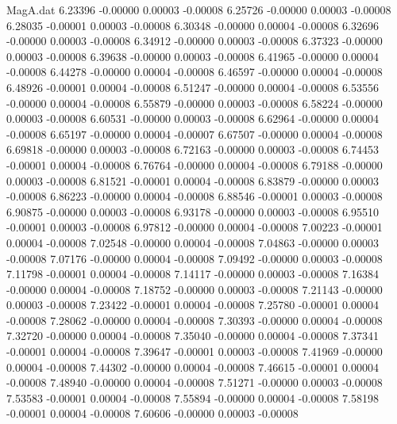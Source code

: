\begin{filecontents}{MagA.dat}
   6.23396   -0.00000    0.00003   -0.00008
   6.25726   -0.00000    0.00003   -0.00008
   6.28035   -0.00001    0.00003   -0.00008
   6.30348   -0.00000    0.00004   -0.00008
   6.32696   -0.00000    0.00003   -0.00008
   6.34912   -0.00000    0.00003   -0.00008
   6.37323   -0.00000    0.00003   -0.00008
   6.39638   -0.00000    0.00003   -0.00008
   6.41965   -0.00000    0.00004   -0.00008
   6.44278   -0.00000    0.00004   -0.00008
   6.46597   -0.00000    0.00004   -0.00008
   6.48926   -0.00001    0.00004   -0.00008
   6.51247   -0.00000    0.00004   -0.00008
   6.53556   -0.00000    0.00004   -0.00008
   6.55879   -0.00000    0.00003   -0.00008
   6.58224   -0.00000    0.00003   -0.00008
   6.60531   -0.00000    0.00003   -0.00008
   6.62964   -0.00000    0.00004   -0.00008
   6.65197   -0.00000    0.00004   -0.00007
   6.67507   -0.00000    0.00004   -0.00008
   6.69818   -0.00000    0.00003   -0.00008
   6.72163   -0.00000    0.00003   -0.00008
   6.74453   -0.00001    0.00004   -0.00008
   6.76764   -0.00000    0.00004   -0.00008
   6.79188   -0.00000    0.00003   -0.00008
   6.81521   -0.00001    0.00004   -0.00008
   6.83879   -0.00000    0.00003   -0.00008
   6.86223   -0.00000    0.00004   -0.00008
   6.88546   -0.00001    0.00003   -0.00008
   6.90875   -0.00000    0.00003   -0.00008
   6.93178   -0.00000    0.00003   -0.00008
   6.95510   -0.00001    0.00003   -0.00008
   6.97812   -0.00000    0.00004   -0.00008
   7.00223   -0.00001    0.00004   -0.00008
   7.02548   -0.00000    0.00004   -0.00008
   7.04863   -0.00000    0.00003   -0.00008
   7.07176   -0.00000    0.00004   -0.00008
   7.09492   -0.00000    0.00003   -0.00008
   7.11798   -0.00001    0.00004   -0.00008
   7.14117   -0.00000    0.00003   -0.00008
   7.16384   -0.00000    0.00004   -0.00008
   7.18752   -0.00000    0.00003   -0.00008
   7.21143   -0.00000    0.00003   -0.00008
   7.23422   -0.00001    0.00004   -0.00008
   7.25780   -0.00001    0.00004   -0.00008
   7.28062   -0.00000    0.00004   -0.00008
   7.30393   -0.00000    0.00004   -0.00008
   7.32720   -0.00000    0.00004   -0.00008
   7.35040   -0.00000    0.00004   -0.00008
   7.37341   -0.00001    0.00004   -0.00008
   7.39647   -0.00001    0.00003   -0.00008
   7.41969   -0.00000    0.00004   -0.00008
   7.44302   -0.00000    0.00004   -0.00008
   7.46615   -0.00001    0.00004   -0.00008
   7.48940   -0.00000    0.00004   -0.00008
   7.51271   -0.00000    0.00003   -0.00008
   7.53583   -0.00001    0.00004   -0.00008
   7.55894   -0.00000    0.00004   -0.00008
   7.58198   -0.00001    0.00004   -0.00008
   7.60606   -0.00000    0.00003   -0.00008

\end{filecontents}
